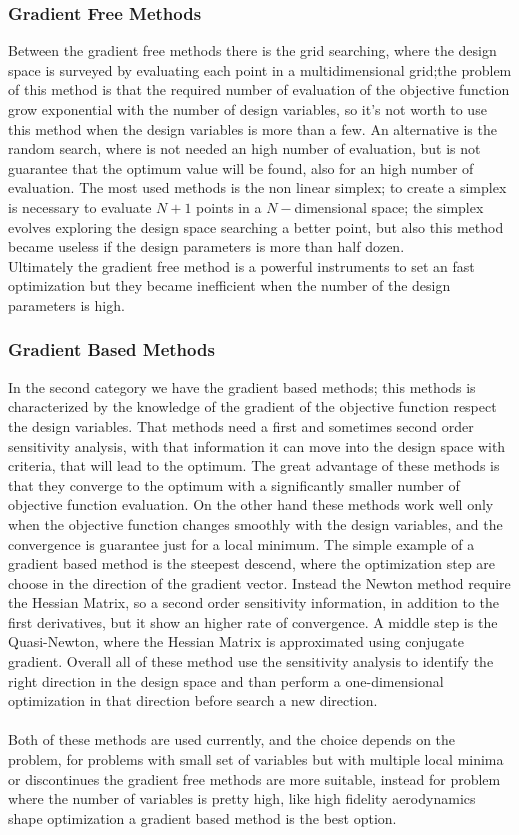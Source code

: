 \subsubsection{Gradient Free Methods}
Between the gradient free methods there is the grid searching, where the design space is surveyed by evaluating each point in a multidimensional grid;the problem of this method is that the required number of evaluation of the objective function grow exponential with the number of design variables, so it's not worth to use this method when the design variables is more than a few. An alternative is the random search, where is not needed an high number of evaluation, but is not guarantee that the optimum value will be found, also for an high number of evaluation. The most used methods is the non linear simplex; to create a simplex is necessary to evaluate $N+1$ points in a $N-$dimensional space; the simplex evolves exploring the design space searching a better point, but also this method became useless if the design parameters is more than half dozen.\\
Ultimately the gradient free method is a powerful instruments to set an fast optimization but they became inefficient when the number of the design parameters is high.\\
\subsubsection{Gradient Based Methods}
In the second category we have the gradient based methods; this methods is characterized by the knowledge of the gradient of the objective function respect the design variables. That methods need a first and sometimes second order sensitivity analysis, with that information it can move into the design space with criteria, that will lead to the optimum. The great advantage of these methods is that they converge to the optimum with a significantly smaller number of objective function evaluation. On the other hand these methods work well only when the objective function changes smoothly with the design variables, and the convergence is guarantee just for a local minimum. The simple example of a gradient based method is the steepest descend, where the optimization step are choose in the direction of the gradient vector. Instead the Newton method require the Hessian Matrix, so a second order sensitivity information, in addition to the first derivatives, but it show an higher rate of convergence. A middle step is the Quasi-Newton, where the Hessian Matrix is approximated using conjugate gradient. Overall all of these method use the sensitivity analysis to identify the right direction in the design space and than perform a one-dimensional optimization in that direction before search a new direction.\\
\\
Both of these methods are used currently, and the choice depends on the problem, for problems with small set of variables but with multiple local minima or discontinues the gradient free methods are more suitable, instead for problem where the number of variables is pretty high, like high fidelity aerodynamics shape optimization a gradient based method is the best option.
